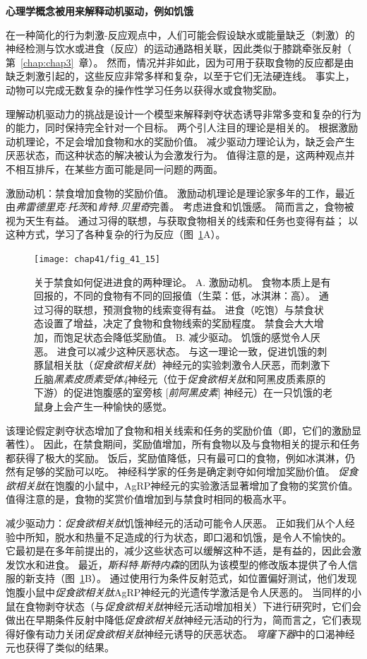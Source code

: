 \textbf{心理学概念被用来解释动机驱动，例如饥饿}

在一种简化的行为刺激-反应观点中，人们可能会假设缺水或能量缺乏（刺激）的神经检测与饮水或进食（反应）的运动通路相关联，因此类似于膝跳牵张反射（ 第~\ref{chap:chap3}~章）。
然而，情况并非如此，因为可用于获取食物的反应都是由缺乏刺激引起的，这些反应非常多样和复杂，以至于它们无法硬连线。
事实上，动物可以完成无数复杂的操作性学习任务以获得水或食物奖励。


理解动机驱动力的挑战是设计一个模型来解释剥夺状态诱导非常多变和复杂的行为的能力，同时保持完全针对一个目标。 两个引人注目的理论是相关的。
根据激励动机理论，不足会增加食物和水的奖励价值。 减少驱动力理论认为，缺乏会产生厌恶状态，而这种状态的解决被认为会激发行为。
值得注意的是，这两种观点并不相互排斥，在某些方面可能是同一问题的两面。


激励动机：禁食增加食物的奖励价值。
激励动机理论是理论家多年的工作，最近由\textit{弗雷德里克$\cdot$托茨}和\textit{肯特.贝里奇}完善。
考虑进食和饥饿感。
简而言之，食物被视为天生有益。
通过习得的联想，与获取食物相关的线索和任务也变得有益；
以这种方式，学习了各种复杂的行为反应（图~\ref{fig:41_15}A）。


\begin{figure}[htbp]
	\centering
	\texttt{[image: chap41/fig\_41\_15]}
	\caption{关于禁食如何促进进食的两种理论。 
		A. 激励动机。
		食物本质上是有回报的，不同的食物有不同的回报值（生菜：低，冰淇淋：高）。
		通过习得的联想，预测食物的线索变得有益。 进食（吃饱）与禁食状态设置了增益，决定了食物和食物线索的奖励程度。
		禁食会大大增加，而饱足状态会降低奖励值。
		B. 减少驱动。
		饥饿的感觉令人厌恶。
		进食可以减少这种厌恶状态。
		与这一理论一致，促进饥饿的刺豚鼠相关肽（\textit{促食欲相关肽}）神经元的实验刺激令人厌恶，而刺激下丘脑\textit{黑素皮质素受体4}神经元（位于\textit{促食欲相关肽}和阿黑皮质素原的下游）的促进饱腹感的室旁核 [\textit{前阿黑皮素}] 神经元）在一只饥饿的老鼠身上会产生一种愉快的感觉。}
	\label{fig:41_15}
\end{figure}


该理论假定剥夺状态增加了食物和相关线索和任务的奖励价值（即，它们的激励显著性）。
因此，在禁食期间，奖励值增加，所有食物以及与食物相关的提示和任务都获得了极大的奖励。
饭后，奖励值降低，只有最可口的食物，例如冰淇淋，仍然有足够的奖励可以吃。
神经科学家的任务是确定剥夺如何增加奖励价值。
\textit{促食欲相关肽}在饱腹的小鼠中，AgRP神经元的实验激活显著增加了食物的奖赏价值。值得注意的是，食物的奖赏价值增加到与禁食时相同的极高水平。


减少驱动力：\textit{促食欲相关肽}饥饿神经元的活动可能令人厌恶。
正如我们从个人经验中所知，脱水和热量不足造成的行为状态，即口渴和饥饿，是令人不愉快的。
它最初是在多年前提出的，减少这些状态可以缓解这种不适，是有益的，因此会激发饮水和进食。
最近，\textit{斯科特$\cdot$斯特内森}的团队为该模型的修改版本提供了令人信服的新支持（图~\ref{fig:41_15}B）。
通过使用行为条件反射范式，如位置偏好测试，他们发现饱腹小鼠中\textit{促食欲相关肽}AgRP神经元的光遗传学激活是令人厌恶的。
当同样的小鼠在食物剥夺状态（与\textit{促食欲相关肽}神经元活动增加相关）下进行研究时，它们会做出在早期条件反射中降低\textit{促食欲相关肽}神经元活动的行为，简而言之，它们表现得好像有动力关闭\textit{促食欲相关肽}神经元诱导的厌恶状态。
\textit{穹窿下器}中的口渴神经元也获得了类似的结果。


